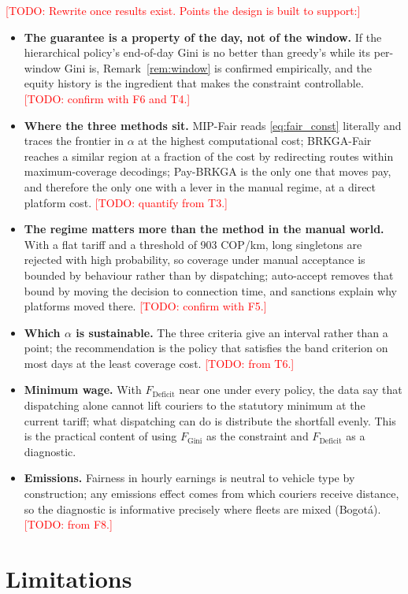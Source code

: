 \documentclass[preprint,12pt,authoryear]{elsarticle}%
\newcommand{\todo}[1]{\textcolor{red}{[TODO: #1]}}
\newcommand{\FG}{F_{\text{Gini}}}
\newcommand{\FD}{F_{\text{Deficit}}}
\begin{document}
\todo{Rewrite once results exist. Points the design is built to support:}
\begin{itemize}
\item \textbf{The guarantee is a property of the day, not of the window.} If the hierarchical policy's end-of-day Gini is no better than greedy's while its per-window Gini is, Remark~\ref{rem:window} is confirmed empirically, and the equity history is the ingredient that makes the constraint controllable. \todo{confirm with F6 and T4.}
\item \textbf{Where the three methods sit.} MIP-Fair reads \eqref{eq:fair_const} literally and traces the frontier in $\alpha$ at the highest computational cost; BRKGA-Fair reaches a similar region at a fraction of the cost by redirecting routes within maximum-coverage decodings; Pay-BRKGA is the only one that moves pay, and therefore the only one with a lever in the manual regime, at a direct platform cost. \todo{quantify from T3.}
\item \textbf{The regime matters more than the method in the manual world.} With a flat tariff and a threshold of 903 COP/km, long singletons are rejected with high probability, so coverage under manual acceptance is bounded by behaviour rather than by dispatching; auto-accept removes that bound by moving the decision to connection time, and sanctions explain why platforms moved there. \todo{confirm with F5.}
\item \textbf{Which $\alpha$ is sustainable.} The three criteria give an interval rather than a point; the recommendation is the policy that satisfies the band criterion on most days at the least coverage cost. \todo{from T6.}
\item \textbf{Minimum wage.} With $\FD$ near one under every policy, the data say that dispatching alone cannot lift couriers to the statutory minimum at the current tariff; what dispatching can do is distribute the shortfall evenly. This is the practical content of using $\FG$ as the constraint and $\FD$ as a diagnostic.
\item \textbf{Emissions.} Fairness in hourly earnings is neutral to vehicle type by construction; any emissions effect comes from which couriers receive distance, so the diagnostic is informative precisely where fleets are mixed (Bogot\'a). \todo{from F8.}
\end{itemize}

\section{Limitations}
\label{sec:limitations}
\end{document}
